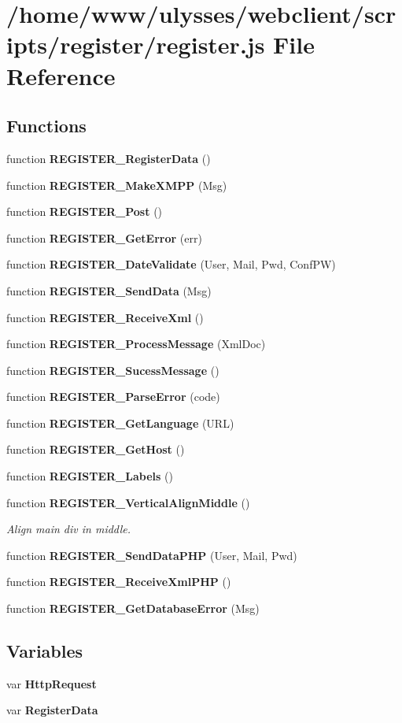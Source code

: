 \section{/home/www/ulysses/webclient/scripts/register/register.js File Reference}
\label{register_8js}
\subsection*{Functions}
\begin{CompactItemize}
\item 
function {\bf REGISTER\_\-RegisterData} ()
\item 
function {\bf REGISTER\_\-MakeXMPP} (Msg)
\item 
function {\bf REGISTER\_\-Post} ()
\item 
function {\bf REGISTER\_\-GetError} (err)
\item 
function {\bf REGISTER\_\-DateValidate} (User, Mail, Pwd, ConfPW)
\item 
function {\bf REGISTER\_\-SendData} (Msg)
\item 
function {\bf REGISTER\_\-ReceiveXml} ()
\item 
function {\bf REGISTER\_\-ProcessMessage} (XmlDoc)
\item 
function {\bf REGISTER\_\-SucessMessage} ()
\item 
function {\bf REGISTER\_\-ParseError} (code)
\item 
function {\bf REGISTER\_\-GetLanguage} (URL)
\item 
function {\bf REGISTER\_\-GetHost} ()
\item 
function {\bf REGISTER\_\-Labels} ()
\item 
function {\bf REGISTER\_\-VerticalAlignMiddle} ()
\begin{CompactList}\small\item\em Align main div in middle. \item\end{CompactList}\item 
function {\bf REGISTER\_\-SendDataPHP} (User, Mail, Pwd)
\item 
function {\bf REGISTER\_\-ReceiveXmlPHP} ()
\item 
function {\bf REGISTER\_\-GetDatabaseError} (Msg)
\end{CompactItemize}
\subsection*{Variables}
\begin{CompactItemize}
\item 
var {\bf HttpRequest}
\item 
var {\bf RegisterData}
\end{CompactItemize}


